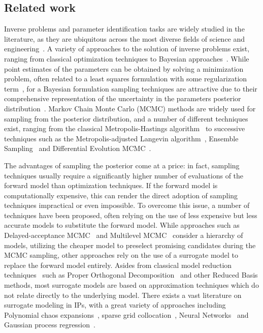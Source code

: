 \subsection{Related work}\label{sec:literature}

Inverse problems and parameter identification tasks are widely studied in the literature, as they are ubiquitous across the most diverse fields of science and engineering~\cite{KaipioSomersalo2005}.
A variety of approaches to the solution of inverse problems exist, ranging from classical optimization techniques to Bayesian approaches~\cite{Tarantola2005}.
While point estimates of the parameters can be obtained by solving a minimization problem, often related to a least squares formulation with some regularization term~\cite{EngelHankeNeubauer1996}, for a Bayesian formulation sampling techniques are attractive due to their comprehensive representation of the uncertainty in the parameters posterior distribution~\cite{Sullivan2015}.
Markov Chain Monte Carlo (MCMC) methods are widely used for sampling from the posterior distribution, and a number of different techniques exist, ranging from the classical Metropolis-Hastings algorithm~\cite{MetropolisRosenbluthRosenbluthTellerTeller1953,Hastings1970} to successive techniques such as the Metropolis-adjusted Langevin algorithm~\cite{RobertsTweedie1996}, Ensemble Sampling~\cite{GoodmanWeare} and Differential Evolution MCMC~\cite{TerBraak}.\medskip

The advantages of sampling the posterior come at a price: in fact, sampling techniques usually require a significantly higher number of evaluations of the forward model than optimization techniques.
If the forward model is computationally expensive, this can render the direct adoption of sampling techniques impractical or even impossible.
To overcome this issue, a number of techniques have been proposed, often relying on the use of less expensive but less accurate models to substitute the forward model.
While approaches such as Delayed-acceptance MCMC~\cite{ChristenFox2005} and Multilevel MCMC~\cite{DodwellKetelsenScheichlTeckentrup2015} consider a hierarchy of models, utilizing the cheaper model to preselect promising candidates during the MCMC sampling, other approaches rely on the use of a surrogate model to replace the forward model entirely.
Asides from classical model reduction techniques~\cite{Schilders2008} such as Proper Orthogonal Decomposition~\cite{PateraRozza2007} and other Reduced Basis methods, most surrogate models are based on approximation techniques which do not relate directly to the underlying model.
There exists a vast literature on surrogate modeling in IPs, with a great variety of approaches including Polynomial chaos expansions~\cite{MarzoukNajmRahn2007}, sparse grid collocation~\cite{XiangZabaras2009}, Neural Networks~\cite{ZhouTartakovsky2021} and Gaussian process regression~\cite{Rasmussen2003}. \medskip

